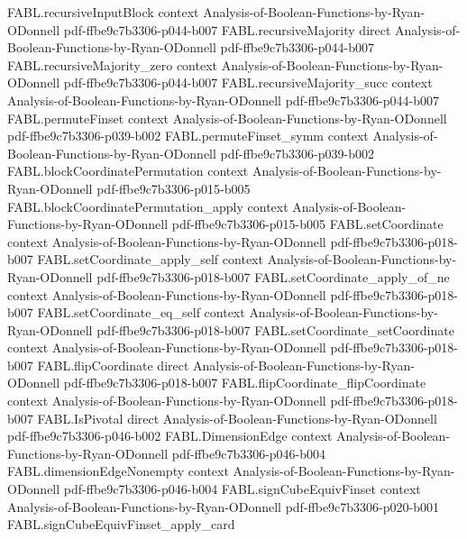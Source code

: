 \begin{theorem}
\proofstep
  {FABL.recursiveInputBlock}
  {context}
  {Analysis-of-Boolean-Functions-by-Ryan-ODonnell}
  {pdf-ffbe9c7b3306-p044-b007}
\proofstep
  {FABL.recursiveMajority}
  {direct}
  {Analysis-of-Boolean-Functions-by-Ryan-ODonnell}
  {pdf-ffbe9c7b3306-p044-b007}
\proofstep
  {FABL.recursiveMajority_zero}
  {context}
  {Analysis-of-Boolean-Functions-by-Ryan-ODonnell}
  {pdf-ffbe9c7b3306-p044-b007}
\proofstep
  {FABL.recursiveMajority_succ}
  {context}
  {Analysis-of-Boolean-Functions-by-Ryan-ODonnell}
  {pdf-ffbe9c7b3306-p044-b007}
\proofstep
  {FABL.permuteFinset}
  {context}
  {Analysis-of-Boolean-Functions-by-Ryan-ODonnell}
  {pdf-ffbe9c7b3306-p039-b002}
\proofstep
  {FABL.permuteFinset_symm}
  {context}
  {Analysis-of-Boolean-Functions-by-Ryan-ODonnell}
  {pdf-ffbe9c7b3306-p039-b002}
\proofstep
  {FABL.blockCoordinatePermutation}
  {context}
  {Analysis-of-Boolean-Functions-by-Ryan-ODonnell}
  {pdf-ffbe9c7b3306-p015-b005}
\proofstep
  {FABL.blockCoordinatePermutation_apply}
  {context}
  {Analysis-of-Boolean-Functions-by-Ryan-ODonnell}
  {pdf-ffbe9c7b3306-p015-b005}
\proofstep
  {FABL.setCoordinate}
  {context}
  {Analysis-of-Boolean-Functions-by-Ryan-ODonnell}
  {pdf-ffbe9c7b3306-p018-b007}
\proofstep
  {FABL.setCoordinate_apply_self}
  {context}
  {Analysis-of-Boolean-Functions-by-Ryan-ODonnell}
  {pdf-ffbe9c7b3306-p018-b007}
\proofstep
  {FABL.setCoordinate_apply_of_ne}
  {context}
  {Analysis-of-Boolean-Functions-by-Ryan-ODonnell}
  {pdf-ffbe9c7b3306-p018-b007}
\proofstep
  {FABL.setCoordinate_eq_self}
  {context}
  {Analysis-of-Boolean-Functions-by-Ryan-ODonnell}
  {pdf-ffbe9c7b3306-p018-b007}
\proofstep
  {FABL.setCoordinate_setCoordinate}
  {context}
  {Analysis-of-Boolean-Functions-by-Ryan-ODonnell}
  {pdf-ffbe9c7b3306-p018-b007}
\proofstep
  {FABL.flipCoordinate}
  {direct}
  {Analysis-of-Boolean-Functions-by-Ryan-ODonnell}
  {pdf-ffbe9c7b3306-p018-b007}
\proofstep
  {FABL.flipCoordinate_flipCoordinate}
  {context}
  {Analysis-of-Boolean-Functions-by-Ryan-ODonnell}
  {pdf-ffbe9c7b3306-p018-b007}
\proofstep
  {FABL.IsPivotal}
  {direct}
  {Analysis-of-Boolean-Functions-by-Ryan-ODonnell}
  {pdf-ffbe9c7b3306-p046-b002}
\proofstep
  {FABL.DimensionEdge}
  {context}
  {Analysis-of-Boolean-Functions-by-Ryan-ODonnell}
  {pdf-ffbe9c7b3306-p046-b004}
\proofstep
  {FABL.dimensionEdgeNonempty}
  {context}
  {Analysis-of-Boolean-Functions-by-Ryan-ODonnell}
  {pdf-ffbe9c7b3306-p046-b004}
\proofstep
  {FABL.signCubeEquivFinset}
  {context}
  {Analysis-of-Boolean-Functions-by-Ryan-ODonnell}
  {pdf-ffbe9c7b3306-p020-b001}
\proofstep
  {FABL.signCubeEquivFinset_apply_card}

\end{theorem}
